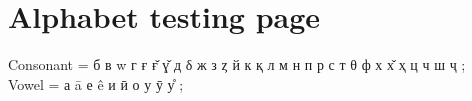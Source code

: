 \section{Alphabet testing page}

Consonant = б в w г ғ \v{ғ} \v{ɣ} д δ ж з ȥ й к қ л м н п р с т θ ф х \v{х} ҳ ц ч ш ҷ ;\\
Vowel =     а ā е ê и ӣ о у ӯ \r{у} ;